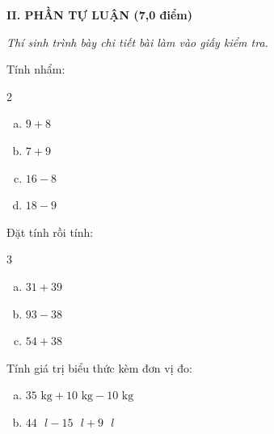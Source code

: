 \vspace{4mm}
\textbf{\large II. PHẦN TỰ LUẬN (7,0 điểm)}

{\itshape Thí sinh trình bày chi tiết bài làm vào giấy kiểm tra.}

\begin{bt}[1,0 điểm]
Tính nhẩm:
\begin{multicols}{2}
\begin{enumerate}[a)]
  \item $9 + 8$
  \item $7 + 9$
  \item $16 - 8$
  \item $18 - 9$
\end{enumerate}
\end{multicols}
\end{bt}

\begin{bt}[1,5 điểm]
Đặt tính rồi tính:
\begin{multicols}{3}
\begin{enumerate}[a)]
  \item $31 + 39$
  \item $93 - 38$
  \item $54 + 38$
\end{enumerate}
\end{multicols}
\end{bt}

\begin{bt}[1,0 điểm]
Tính giá trị biểu thức kèm đơn vị đo:
\begin{enumerate}[a)]
  \item $35\text{ kg} + 10\text{ kg} - 10\text{ kg}$
  \item $44\text{ }l - 15\text{ }l + 9\text{ }l$
\end{enumerate}
\end{bt}

